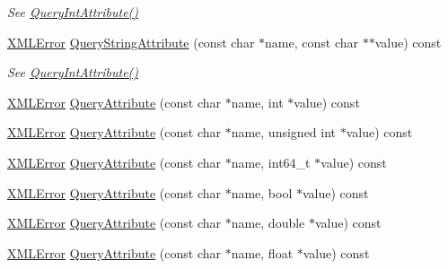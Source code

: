 \begin{DoxyCompactItemize}
\begin{DoxyCompactList}\small\item\em See \mbox{\hyperlink{classtinyxml2_1_1_x_m_l_element_a8a78bc1187c1c45ad89f2690eab567b1}{Query\+Int\+Attribute()}} \end{DoxyCompactList}\item 
\mbox{\hyperlink{namespacetinyxml2_a1fbf88509c3ac88c09117b1947414e08}{X\+M\+L\+Error}} \mbox{\hyperlink{classtinyxml2_1_1_x_m_l_element_adb8ae765f98d0c5037faec48deea78bc}{Query\+String\+Attribute}} (const char $\ast$name, const char $\ast$$\ast$value) const
\begin{DoxyCompactList}\small\item\em See \mbox{\hyperlink{classtinyxml2_1_1_x_m_l_element_a8a78bc1187c1c45ad89f2690eab567b1}{Query\+Int\+Attribute()}} \end{DoxyCompactList}\item 
\mbox{\hyperlink{namespacetinyxml2_a1fbf88509c3ac88c09117b1947414e08}{X\+M\+L\+Error}} \mbox{\hyperlink{classtinyxml2_1_1_x_m_l_element_a5b7df3bed2b8954eabf227fa204522eb}{Query\+Attribute}} (const char $\ast$name, int $\ast$value) const
\item 
\mbox{\hyperlink{namespacetinyxml2_a1fbf88509c3ac88c09117b1947414e08}{X\+M\+L\+Error}} \mbox{\hyperlink{classtinyxml2_1_1_x_m_l_element_a432276ea6e034cad19ad66de887ee13c}{Query\+Attribute}} (const char $\ast$name, unsigned int $\ast$value) const
\item 
\mbox{\hyperlink{namespacetinyxml2_a1fbf88509c3ac88c09117b1947414e08}{X\+M\+L\+Error}} \mbox{\hyperlink{classtinyxml2_1_1_x_m_l_element_a4867aea7a812acf7f00a915e4eaeaf3e}{Query\+Attribute}} (const char $\ast$name, int64\+\_\+t $\ast$value) const
\item 
\mbox{\hyperlink{namespacetinyxml2_a1fbf88509c3ac88c09117b1947414e08}{X\+M\+L\+Error}} \mbox{\hyperlink{classtinyxml2_1_1_x_m_l_element_a17139a22f2552439a7c2780e8e901522}{Query\+Attribute}} (const char $\ast$name, bool $\ast$value) const
\item 
\mbox{\hyperlink{namespacetinyxml2_a1fbf88509c3ac88c09117b1947414e08}{X\+M\+L\+Error}} \mbox{\hyperlink{classtinyxml2_1_1_x_m_l_element_a4f4da49900e82e25d163a7c0325fcc5f}{Query\+Attribute}} (const char $\ast$name, double $\ast$value) const
\item 
\mbox{\hyperlink{namespacetinyxml2_a1fbf88509c3ac88c09117b1947414e08}{X\+M\+L\+Error}} \mbox{\hyperlink{classtinyxml2_1_1_x_m_l_element_ac85b18ccd9ee8a79a2fd97cc593aae43}{Query\+Attribute}} (const char $\ast$name, float $\ast$value) const
$$
\end{DoxyCompactItemize}
